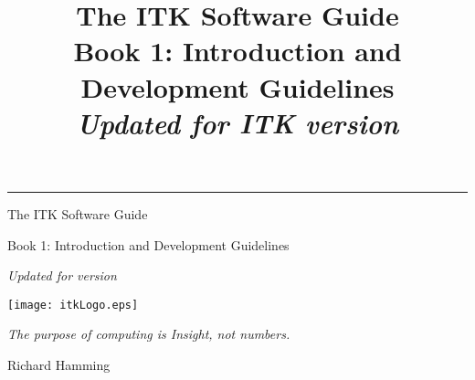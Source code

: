 \documentclass{InsightSoftwareGuide}
\title{The ITK Software Guide\\Book 1: Introduction and Development Guidelines\\ \emph{Updated for ITK version
\ITKVERSIONMAJORMINOR}}
\begin{document}
\ifitkPrintedVersionFirstPage

  \begin{minipage}[t][3cm][b]{\textwidth}
  \rule{14cm}{1pt}
  \end{minipage}

  \begin{minipage}[t][3cm][b]{\textwidth}
  \Huge
  The ITK Software Guide
  \Large
  \par
  Book 1: Introduction and Development Guidelines\\
  \normalsize
  \par
  \emph{Updated for version \ITKVERSIONMAJORMINOR}\\

  \end{minipage}


\fi

\maketitle
\ifitkPrintedVersion
\fi

\frontmatter


\ifitkPrintedVersion
  
  
\fi


%
%
%
\cleardoublepage

\begin{minipage}[t][10cm][b]{\textwidth}
\center
\texttt{[image: itkLogo.eps]}
\large
\begin{center}
\emph{The purpose of computing is Insight, not numbers.}\\
\end{center}
\hspace{8cm} Richard Hamming
\normalsize
\end{minipage}



%
\pagestyle{plain}
%


\ifitkPrintedVersion
  
\fi
\end{document}
